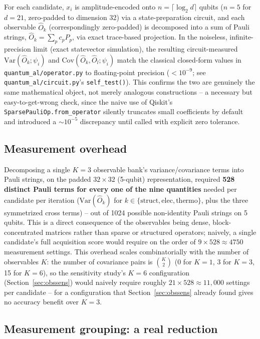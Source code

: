 \documentclass[conference]{IEEEtran}
\begin{document}
For each candidate, $x_i$ is amplitude-encoded onto $n=\lceil\log_2 d\rceil$ qubits ($n=5$ for $d=21$, zero-padded to dimension 32) via a state-preparation circuit, and each observable $\hat{O}_k$ (correspondingly zero-padded) is decomposed into a sum of Pauli strings, $\hat{O}_k = \sum_p c_p P_p$, via exact trace-based projection. In the noiseless, infinite-precision limit (exact statevector simulation), the resulting circuit-measured $\mathrm{Var}(\hat{O}_k;\psi_i)$ and $\mathrm{Cov}(\hat{O}_k,\hat{O}_l;\psi_i)$ match the classical closed-form values in \texttt{quantum\_al/operator.py} to floating-point precision ($<10^{-9}$; see \texttt{quantum\_al/circuit.py}'s \texttt{self\_test()}). This confirms the two are genuinely the same mathematical object, not merely analogous constructions -- a necessary but easy-to-get-wrong check, since the naive use of Qiskit's \texttt{SparsePauliOp.from\_operator} silently truncates small coefficients by default and introduced a $\sim\!10^{-5}$ discrepancy until called with explicit zero tolerance.

\subsection{Measurement overhead}

Decomposing a single $K{=}3$ observable bank's variance/covariance terms into Pauli strings, on the padded $32\times32$ (5-qubit) representation, required \textbf{528 distinct Pauli terms for every one of the nine quantities} needed per candidate per iteration ($\mathrm{Var}(\hat{O}_k)$ for $k\in\{\mathrm{struct,elec,thermo}\}$, plus the three symmetrized cross terms) -- out of 1024 possible non-identity Pauli strings on 5 qubits. This is a direct consequence of the observables being dense, block-concentrated matrices rather than sparse or structured operators; naively, a single candidate's full acquisition score would require on the order of $9\times528\approx4750$ measurement settings. This overhead scales combinatorially with the number of observables $K$: the number of covariance pairs is $\binom{K}{2}$ (0 for $K{=}1$, 3 for $K{=}3$, 15 for $K{=}6$), so the sensitivity study's $K{=}6$ configuration (Section~\ref{sec:obssens}) would naively require roughly $21\times528\approx11{,}000$ settings per candidate -- for a configuration that Section~\ref{sec:obssens} already found gives no accuracy benefit over $K{=}3$.

\subsection{Measurement grouping: a real reduction}\label{sec:grouping}
\end{document}
